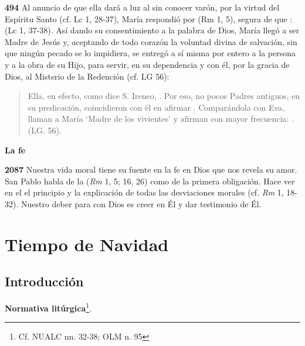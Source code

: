 \textbf{}

\textbf{494} Al anuncio de que ella dará a luz al  sin conocer varón, por la virtud del Espíritu Santo (cf. Lc 1, 28-37), María respondió por  (Rm 1, 5), segura de que :  (Lc 1, 37-38). Así dando su consentimiento a la palabra de Dios, María llegó a ser Madre de Jesús y, aceptando de todo corazón la voluntad divina de salvación, sin que ningún pecado se lo impidiera, se entregó a sí misma por entero a la persona y a la obra de su Hijo, para servir, en su dependencia y con él, por la gracia de Dios, al Misterio de la Redención (cf. LG 56):

\begin{quote} Ella, en efecto, como dice S. Ireneo, . Por eso, no pocos Padres antiguos, en su predicación, coincidieron con él en afirmar . Comparándola con Eva, llaman a María `Madre de los vivientes' y afirman con mayor frecuencia: . (LG. 56). \end{quote}

\textbf{La fe}

\textbf{2087} Nuestra vida moral tiene su fuente en la fe en Dios que nos revela su amor. San Pablo habla de la  (\emph{Rm} 1, 5; 16, 26) como de la primera obligación. Hace ver en el  el principio y la explicación de todas las desviaciones morales (cf. \emph{Rm} 1, 18-32). Nuestro deber para con Dios es creer en Él y dar testimonio de Él.


\part{Tiempo de Navidad}

\chapter{Introducción}

\textbf{Normativa litúrgica}\footnote{Cf. NUALC nn. 32-38; OLM n. 95}.

